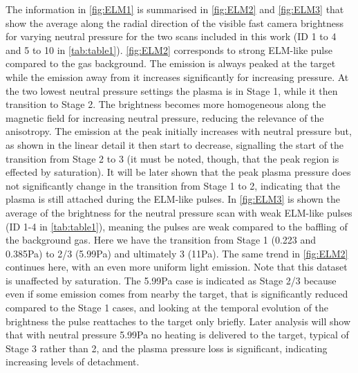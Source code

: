 The information in \autoref{fig:ELM1} is summarised in \autoref{fig:ELM2} and \ref{fig:ELM3} that show the average along the radial direction of the visible fast camera brightness for varying neutral pressure for the two scans included in this work (ID 1 to 4 and 5 to 10 in \autoref{tab:table1}).
\autoref{fig:ELM2} corresponds to strong ELM-like pulse compared to the gas background. The emission is always peaked at the target while the emission away from it increases significantly for increasing pressure. At the two lowest neutral pressure settings the plasma is in Stage 1, while it then transition to Stage 2. The brightness becomes more homogeneous along the magnetic field for increasing neutral pressure, reducing the relevance of the anisotropy. The emission at the peak initially increases with neutral pressure but, as shown in the linear detail it then start to decrease, signalling the start of the transition from Stage 2 to 3 (it must be noted, though, that the peak region is effected by saturation). It will be later shown that the peak plasma pressure does not significantly change in the transition from Stage 1 to 2, indicating that the plasma is still attached during the ELM-like pulses.
In \autoref{fig:ELM3} is shown the average of the brightness for the neutral pressure scan with weak ELM-like pulses (ID 1-4 in \autoref{tab:table1}), meaning the pulses are weak compared to the baffling of the background gas. Here we have the transition from Stage 1 (0.223 and 0.385Pa) to 2/3 (5.99Pa) and ultimately 3 (11Pa). The same trend in \autoref{fig:ELM2} continues here, with an even more uniform light emission. Note that this dataset is unaffected by saturation. The 5.99Pa case is indicated as Stage 2/3 because even if some emission comes from nearby the target, that is significantly reduced compared to the Stage 1 cases, and looking at the temporal evolution of the brightness the pulse reattaches to the target only briefly. Later analysis will show that with neutral pressure 5.99Pa no heating is delivered to the target, typical of Stage 3 rather than 2, and the plasma pressure loss is significant, indicating increasing levels of detachment.

